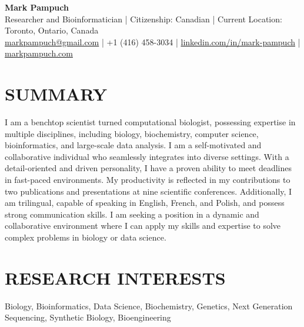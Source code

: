 \documentclass[a4paper,9pt]{extarticle}
\begin{document}
\pagestyle{fancy}
\renewcommand{\headrulewidth}{0pt}
\fancyhead{}
\thispagestyle{empty} %

\begin{flushleft}
	\textbf{\huge Mark Pampuch}\\[2pt] 
	Researcher and Bioinformatician | Citizenship: Canadian | Current Location: Toronto, Ontario, Canada
	\\ \href{mailto:markpampuch@gmail.com}{markpampuch@gmail.com} | +1 (416) 458-3034 | \href{https://www.linkedin.com/in/mark-pampuch/}{linkedin.com/in/mark-pampuch} | \href{https://markpampuch.com}{markpampuch.com} 
\end{flushleft}

\section*{SUMMARY}
\noindent
I am a benchtop scientist turned computational biologist, possessing expertise in multiple disciplines, including biology, biochemistry, computer science, bioinformatics, and large-scale data analysis. I am a self-motivated and collaborative individual who seamlessly integrates into diverse settings. With a detail-oriented and driven personality, I have a proven ability to meet deadlines in fast-paced environments. My productivity is reflected in my contributions to two publications and presentations at nine scientific conferences. Additionally, I am trilingual, capable of speaking in English, French, and Polish, and possess strong communication skills. I am seeking a position in a dynamic and collaborative environment where I can apply my skills and expertise to solve complex problems in biology or data science.

\section*{RESEARCH INTERESTS}
\noindent
Biology, Bioinformatics, Data Science, Biochemistry, Genetics, Next Generation Sequencing, Synthetic Biology, Bioengineering

\end{document}
